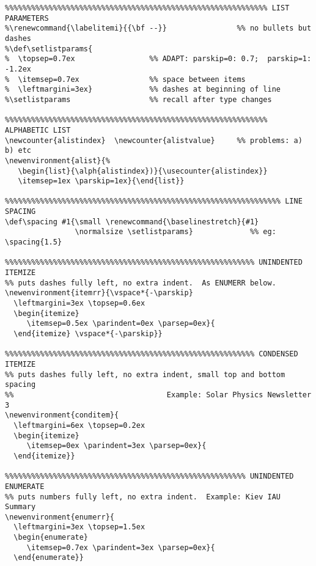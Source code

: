 {\begin{verbatim}
%%%%%%%%%%%%%%%%%%%%%%%%%%%%%%%%%%%%%%%%%%%%%%%%%%%%%%%%%%%% LIST PARAMETERS
%\renewcommand{\labelitemi}{{\bf --}}                %% no bullets but dashes
%\def\setlistparams{         
%  \topsep=0.7ex                 %% ADAPT: parskip=0: 0.7;  parskip=1: -1.2ex
%  \itemsep=0.7ex                %% space between items
%  \leftmargini=3ex}             %% dashes at beginning of line 
%\setlistparams                  %% recall after type changes 

%%%%%%%%%%%%%%%%%%%%%%%%%%%%%%%%%%%%%%%%%%%%%%%%%%%%%%%%%%%% ALPHABETIC LIST
\newcounter{alistindex}  \newcounter{alistvalue}     %% problems: a)  b) etc
\newenvironment{alist}{%
   \begin{list}{\alph{alistindex})}{\usecounter{alistindex}}
   \itemsep=1ex \parskip=1ex}{\end{list}}

%%%%%%%%%%%%%%%%%%%%%%%%%%%%%%%%%%%%%%%%%%%%%%%%%%%%%%%%%%%%%%% LINE SPACING
\def\spacing #1{\small \renewcommand{\baselinestretch}{#1}
                \normalsize \setlistparams}             %% eg: \spacing{1.5}

%%%%%%%%%%%%%%%%%%%%%%%%%%%%%%%%%%%%%%%%%%%%%%%%%%%%%%%%% UNINDENTED ITEMIZE
%% puts dashes fully left, no extra indent.  As ENUMERR below.
\newenvironment{itemrr}{\vspace*{-\parskip}
  \leftmargini=3ex \topsep=0.6ex       
  \begin{itemize}
     \itemsep=0.5ex \parindent=0ex \parsep=0ex}{
  \end{itemize} \vspace*{-\parskip}}

%%%%%%%%%%%%%%%%%%%%%%%%%%%%%%%%%%%%%%%%%%%%%%%%%%%%%%%%% CONDENSED ITEMIZE
%% puts dashes fully left, no extra indent, small top and bottom spacing
%%                                   Example: Solar Physics Newsletter 3
\newenvironment{conditem}{               
  \leftmargini=6ex \topsep=0.2ex 
  \begin{itemize}
     \itemsep=0ex \parindent=3ex \parsep=0ex}{
  \end{itemize}}        

%%%%%%%%%%%%%%%%%%%%%%%%%%%%%%%%%%%%%%%%%%%%%%%%%%%%%%% UNINDENTED ENUMERATE
%% puts numbers fully left, no extra indent.  Example: Kiev IAU Summary
\newenvironment{enumerr}{               
  \leftmargini=3ex \topsep=1.5ex       
  \begin{enumerate}
     \itemsep=0.7ex \parindent=3ex \parsep=0ex}{
  \end{enumerate}}        


\end{verbatim}}
